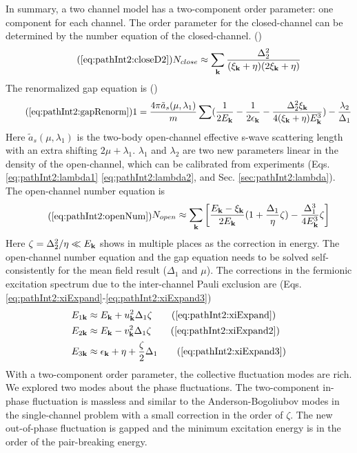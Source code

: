        In  summary, a two channel model has a two-component order parameter: one component for each channel.  The order parameter for the closed-channel can be determined by the number equation of the closed-channel. ()
\begin{equation}\tag{\ref{eq:pathInt2:closeD2}}
N_{close}\approx\sum_{\vk}\frac{\Delta_{2}^2}{(\xi_{\vk}+\eta)(2\xi_{\vk}+\eta)}
\end{equation}
 The renormalized gap equation is ()
 \begin{equation}\tag{\ref{eq:pathInt2:gapRenorm}}
1=\frac{4\pi{\tilde{a}_{s}(\mu,\lambda_{1})}}{m}\sum(\nth{2E_{\vk}}-\nth{2\epsilon_{\vk}}-\frac{\Delta_{2}^{2}\xi_{\vk}}{4(\xi_{\vk}+\eta){E_{\vk}^{3}}})
	-\frac{\lambda_{2}}{\Delta_{1}}
\end{equation}
Here $\tilde{a}_{s}(\mu,\lambda_{1})$ is the two-body open-channel effective  s-wave scattering length with  an extra shifting $2\mu+\lambda_{1}$.   $\lambda_{1}$ and $\lambda_{2}$ are two new parameters linear in the density of the open-channel, which can be calibrated from  experiments (Eqs. \ref{eq:pathInt2:lambda1} \ref{eq:pathInt2:lambda2}, and Sec. \ref{sec:pathInt2:lambda}).  The open-channel number equation is 
\begin{equation}\tag{\ref{eq:pathInt2:openNum}}
\begin{split}
N_{open}\approx\sum_\vk\mbr{\frac{E_\vk-\xi_\vk}{2E_\vk}(1+\frac{\Delta_{1}}{\eta}\zeta)-\frac{\Delta_{1}^{3}}{4E_\vk^{3}}\zeta
	}	
\end{split}
\end{equation}
Here $\zeta=\Delta_{2}^{2}/\eta\ll{}E_{\mathbf{k}}$ shows in multiple places as the correction in energy.  The open-channel number equation and the gap equation needs to be solved self-consistently for the mean field result ($\Delta_{1}$ and $\mu$).  The corrections in the fermionic excitation spectrum due to the inter-channel Pauli exclusion are (Eqs. \ref{eq:pathInt2:xiExpand}-\ref{eq:pathInt2:xiExpand3})
\begin{align}
E_{1\vk}&\approx{}E_{\vk}+u_{\vk}^{2}\Delta_{1}\zeta\tag{\ref{eq:pathInt2:xiExpand}}\\
E_{2\vk}&\approx{}E_{\vk}-v_{\vk}^{2}\Delta_{1}\zeta\tag{\ref{eq:pathInt2:xiExpand2}}\\
E_{3\vk}&\approx{}\epsilon_{\vk}+\eta+\frac{\zeta}{2}\Delta_{1}
\tag{\ref{eq:pathInt2:xiExpand3}}
\end{align}
With a two-component order parameter, the collective fluctuation modes are rich.  We explored two modes about the phase fluctuations.  The two-component in-phase fluctuation is massless and similar to the Anderson-Bogoliubov modes in the single-channel problem with a small correction in the order of $\zeta$.  The new out-of-phase fluctuation is gapped and the minimum excitation energy is in the order of the pair-breaking energy.  

